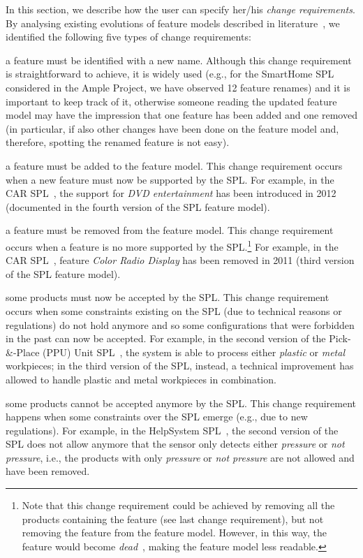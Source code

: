 \begin{tikzborder}{\cite{Gargantini16:validation}}
\begin{tikzborder}{\cite{gargantini_combinatorial_2017}}
\begin{tikzborder}{\cite{garn2019}}
\begin{tikzborder}{\cite{arcaini2019achieving}}
	In this section, we describe how the user can specify her/his {\it change requirements}.
	By analysing existing evolutions of feature models described in literature~\cite{Pleuss2012,Burdek2016,smartHomePaper,helpSystemPaper,multimediaPaper}, we identified the following five types of change requirements: 
	\begin{compactitem}
		\item a feature must be identified with a new name. Although this change requirement is straightforward to achieve, it is widely used (e.g., for the Smart\-Home SPL~\cite{smartHomePaper} considered in the Ample Project, we have observed 12 feature renames) and it is important to keep track of it, otherwise someone reading the updated feature model may have the impression that one feature has been added and one removed (in particular, if also other changes have been done on the feature model and, therefore, spotting the renamed feature is not easy).
		\item a feature must be added to the feature model. This change requirement occurs when a new feature must now be supported by the SPL. For example, in the CAR SPL~\cite{Pleuss2012}, the support for {\it DVD entertainment} has been introduced in 2012 (documented in the fourth version of the SPL feature model).
		\item a feature must be removed from the feature model. This change requirement occurs when a feature is no more supported by the SPL.\footnote{Note that this change requirement could be achieved by removing all the products containing the feature (see last change requirement), but not removing the feature from the feature model. However, in this way, the feature would become {\it dead}~\cite{benavides2010automated}, making the feature model less readable.} For example, in the CAR SPL~\cite{Pleuss2012}, feature {\it Color Radio Display} has been removed in 2011 (third version of the SPL feature model).
		\item some products must now be accepted by the SPL. This change requirement occurs when some constraints existing on the SPL (due to technical reasons or regulations) do not hold anymore and so some configurations that were forbidden in the past can now be accepted. For example, in the second version of the Pick-\&-Place (PPU) Unit SPL~\cite{Burdek2016}, the system is able to process either {\it plastic} or {\it metal} workpieces; in the third version of the SPL, instead, a technical improvement has allowed to handle plastic and metal workpieces in combination.
		\item some products cannot be accepted anymore by the SPL. This change requirement happens when some constraints over the SPL emerge (e.g., due to new regulations). For example, in the {HelpSystem} SPL~\cite{helpSystemPaper}, the second version of the SPL does not allow anymore that the sensor only detects either {\it pressure} or {\it not pressure}, i.e., the products with only {\it pressure} or {\it not pressure} are not allowed and have been removed.

\end{compactitem}
\end{tikzborder}
\end{tikzborder}
\end{tikzborder}
\end{tikzborder}
